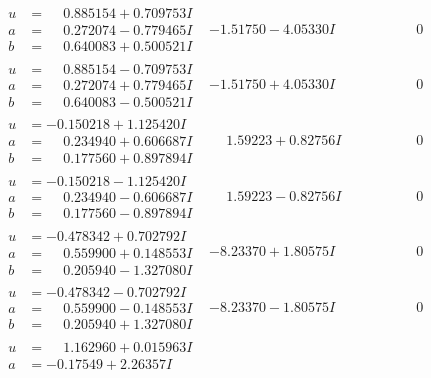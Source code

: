 \documentclass[1p]{elsarticle_modified}
\theoremstyle{definition}
\begin{document}
$$\begin{array}{c|c|c}
 \hline 
\begin{aligned}
u &= \phantom{-}0.885154 + 0.709753 I \\
a &= \phantom{-}0.272074 - 0.779465 I \\
b &= \phantom{-}0.640083 + 0.500521 I\end{aligned}
 & -1.51750 - 4.05330 I & \phantom{-0.000000 } 0 \\ \hline\begin{aligned}
u &= \phantom{-}0.885154 - 0.709753 I \\
a &= \phantom{-}0.272074 + 0.779465 I \\
b &= \phantom{-}0.640083 - 0.500521 I\end{aligned}
 & -1.51750 + 4.05330 I & \phantom{-0.000000 } 0 \\ \hline\begin{aligned}
u &= -0.150218 + 1.125420 I \\
a &= \phantom{-}0.234940 + 0.606687 I \\
b &= \phantom{-}0.177560 + 0.897894 I\end{aligned}
 & \phantom{-}1.59223 + 0.82756 I & \phantom{-0.000000 } 0 \\ \hline\begin{aligned}
u &= -0.150218 - 1.125420 I \\
a &= \phantom{-}0.234940 - 0.606687 I \\
b &= \phantom{-}0.177560 - 0.897894 I\end{aligned}
 & \phantom{-}1.59223 - 0.82756 I & \phantom{-0.000000 } 0 \\ \hline\begin{aligned}
u &= -0.478342 + 0.702792 I \\
a &= \phantom{-}0.559900 + 0.148553 I \\
b &= \phantom{-}0.205940 - 1.327080 I\end{aligned}
 & -8.23370 + 1.80575 I & \phantom{-0.000000 } 0 \\ \hline\begin{aligned}
u &= -0.478342 - 0.702792 I \\
a &= \phantom{-}0.559900 - 0.148553 I \\
b &= \phantom{-}0.205940 + 1.327080 I\end{aligned}
 & -8.23370 - 1.80575 I & \phantom{-0.000000 } 0 \\ \hline\begin{aligned}
u &= \phantom{-}1.162960 + 0.015963 I \\
a &= -0.17549 + 2.26357 I \\

\end{aligned}
\end{array}$$
\end{document}

